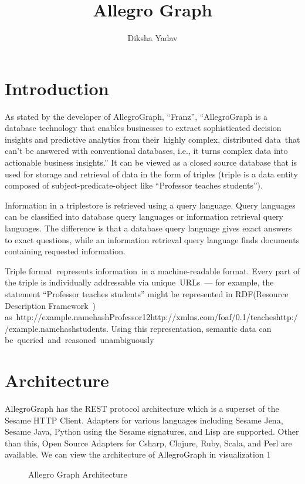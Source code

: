 \documentclass[9pt,twocolumn,twoside]{../../styles/osajnl}
\title{Allegro Graph}
\author[1,*, +]{Diksha Yadav}
\affil[1]{School of Informatics and Computing, Bloomington, IN 47408, U.S.A.}
\affil[*]{Corresponding authors: yadavd@umail.iu.edu}
\affil[+]{HID - S17-IR-2044}
\begin{document}
\maketitle

\section{Introduction}
As stated by the developer of AllegroGraph, “Franz”, “AllegroGraph is a database technology that enables businesses to extract sophisticated decision insights and predictive analytics from their highly complex, distributed data that can’t be answered with conventional databases, i.e., it turns complex data into actionable business insights.” \cite{fag}
It can be viewed as a closed source database that is used for storage and retrieval of data in the form of triples (triple is a data entity composed of subject-predicate-object like “Professor teaches students”). 

Information in a triplestore is retrieved using a query language. Query languages can be classified into database query languages or information retrieval query languages. The difference is that a database query language gives exact answers to exact questions, while an information retrieval query language finds documents containing requested information. \cite{wag}

Triple format represents information in a machine-readable format. Every part of the triple is individually addressable via unique URLs — for example, the statement “Professor teaches students” might be represented in RDF(Resource Description Framework ) as http://example.namehashProfessor12http://xmlns.com/foaf/0.1/teacheshttp://example.namehashstudents. Using this representation, semantic data can be queried and reasoned unambiguously \cite{str}

\section{Architecture}
AllegroGraph has the REST protocol architecture which is a superset of the Sesame HTTP Client. Adapters for various languages including Sesame Jena, Sesame Java, Python using the Sesame signatures, and Lisp are supported. Other than this, Open Source Adapters for Csharp, Clojure, Ruby, Scala, and Perl are available. We can view the architecture of AllegroGraph in visualization 1 \cite{fag}

\begin{figure}[htbp]
	\centering
	\caption{Allegro Graph Architecture}
	\label{fig:Allegro-arch}
\end{figure}
\end{document}
